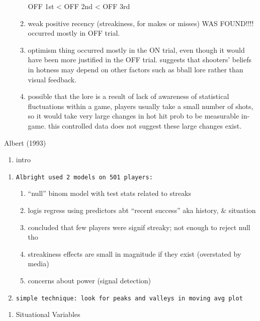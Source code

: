 \documentclass[12pt,twoside]{dukestatscithesis}
\providecommand{\tightlist}{%
  \setlength{\itemsep}{0pt}\setlength{\parskip}{0pt}}
\theoremstyle{definition}
\theoremstyle{definition}
\theoremstyle{definition}
\theoremstyle{remark}
\begin{document}
\begin{enumerate}
\begin{enumerate}
    OFF 1st \textless{} OFF 2nd \textless{} OFF 3rd
  \item
    weak positive recency (streakiness, for makes or misses) WAS
    FOUND!!!! occurred mostly in OFF trial.
  \item
    optimism thing occurred mostly in the ON trial, even though it would
    have been more justified in the OFF trial. suggests that shooters'
    beliefs in hotness may depend on other factors such as bball lore
    rather than visual feedback.
  \item
    possible that the lore is a result of lack of awareness of
    statistical fluctuations within a game, players usually take a small
    number of shots, so it would take very large changes in hot hit prob
    to be measurable in-game. this controlled data does not suggest
    these large changes exist.
  \end{enumerate}
\end{enumerate}
Albert (1993)
\begin{enumerate}
\def\labelenumi{\Alph{enumi}.}
\tightlist
\item
  intro
\end{enumerate}
\begin{enumerate}
\def\labelenumi{\arabic{enumi}.}
\item
\begin{verbatim}
Albright used 2 models on 501 players: 
\end{verbatim}
  \begin{enumerate}
  \def\labelenumii{\alph{enumii}.}
  \tightlist
  \item
    ``null'' binom model with test stats related to streaks
  \item
    logis regress using predictors abt ``recent success'' aka history,
    \& situation
  \item
    concluded that few players were signif streaky; not enough to reject
    null tho
  \item
    streakiness effects are small in magnitude if they exist (overstated
    by media)
  \item
    concerns about power (signal detection)
  \end{enumerate}
\item
\begin{verbatim}
simple technique: look for peaks and valleys in moving avg plot
\end{verbatim}
\end{enumerate}
\begin{enumerate}
\def\labelenumi{\Alph{enumi}.}
\setcounter{enumi}{1}
\tightlist
\item
  Situational Variables
\end{enumerate}
\end{document}
